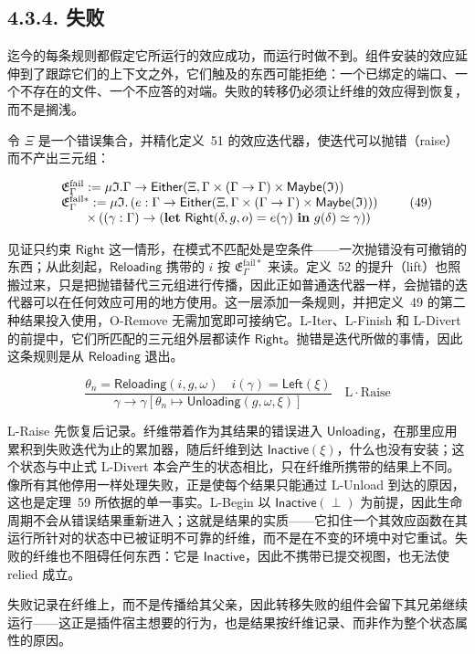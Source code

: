 \subsection{4.3.4. 失败}\label{failure}

迄今的每条规则都假定它所运行的效应成功，而运行时做不到。组件安装的效应延伸到了跟踪它们的上下文之外，它们触及的东西可能拒绝：一个已绑定的端口、一个不存在的文件、一个不应答的对端。失败的转移仍必须让纤维的效应得到恢复，而不是搁浅。

令 \(\Xi\) 是一个错误集合，并精化定义~51 的效应迭代器，使迭代可以抛错（raise）而不产出三元组：

\[
\begin{array} { r l } & { \mathfrak { E } _ { \Gamma } ^ { \mathrm { f a i l } } : = \mu \mathfrak { I } . \Gamma \to \mathsf { E i t h e r } ( \Xi , \Gamma \times ( \Gamma \to \Gamma ) \times \mathsf { M a y b e } ( \mathfrak { I } ) ) } \\ & { \mathfrak { E } _ { \Gamma } ^ { \mathrm { f a i l } * } : = \mu \mathfrak { I } . \left( e : \Gamma \to \mathsf { E i t h e r } ( \Xi , \Gamma \times ( \Gamma \to \Gamma ) \times \mathsf { M a y b e } ( \mathfrak { I } ) ) \right) } \\ & { \qquad \times \left( ( \gamma : \Gamma ) \to ( \mathbf { l e t } \ \mathsf { R i g h t } ( \delta , g , o ) = e ( \gamma ) \ \mathbf { i n } \ g ( \delta ) \simeq \gamma ) \right) } \end{array}\tag{49}
\]

见证只约束 \(\mathsf { R i g h t }\) 这一情形，在模式不匹配处是空条件——一次抛错没有可撤销的东西；从此刻起，\(\mathsf { R e l o a d i n g }\) 携带的 \(i\) 按 \(\mathfrak { E } _ { \Gamma } ^ { \mathrm { f a i l } * }\) 来读。定义~52 的提升（lift）也照搬过来，只是把抛错替代三元组进行传播，因此正如普通迭代器一样，会抛错的迭代器可以在任何效应可用的地方使用。这一层添加一条规则，并把定义~49 的第二种结果投入使用，O-Remove 无需加宽即可接纳它。L-Iter、L-Finish 和 L-Divert 的前提中，它们所匹配的三元组外层都读作 \(\mathsf { R i g h t }\)。抛错是迭代所做的事情，因此这条规则是从 \(\mathsf { R e l o a d i n g }\) 退出。

\[
\frac { \theta _ { n } = \mathsf { R e l o a d i n g } ( i , g , \omega ) \quad i ( \gamma ) = \mathsf { L e f t } ( \xi ) } { \gamma \longrightarrow \gamma [ \theta _ { n } \mapsto \mathsf { U n l o a d i n g } ( g , \omega , \xi ) ] } \quad \mathrm { L \cdot R a i s e }
\]

L-Raise 先恢复后记录。纤维带着作为其结果的错误进入 \(\mathsf { U n l o a d i n g }\)，在那里应用累积到失败迭代为止的累加器，随后纤维到达 \(\mathsf { I n a c t i v e } ( \xi )\)，什么也没有安装；这个状态与中止式 L-Divert 本会产生的状态相比，只在纤维所携带的结果上不同。像所有其他停用一样处理失败，正是使每个结果只能通过 L-Unload 到达的原因，这也是定理~59 所依据的单一事实。L-Begin 以 \(\mathsf { I n a c t i v e } ( \perp )\) 为前提，因此生命周期不会从错误结果重新进入；这就是结果的实质——它扣住一个其效应函数在其运行所针对的状态中已被证明不可靠的纤维，而不是在不变的环境中对它重试。失败的纤维也不阻碍任何东西：它是 \(\mathsf { I n a c t i v e }\)，因此不携带已提交视图，也无法使 relied 成立。

失败记录在纤维上，而不是传播给其父亲，因此转移失败的组件会留下其兄弟继续运行——这正是插件宿主想要的行为，也是结果按纤维记录、而非作为整个状态属性的原因。
